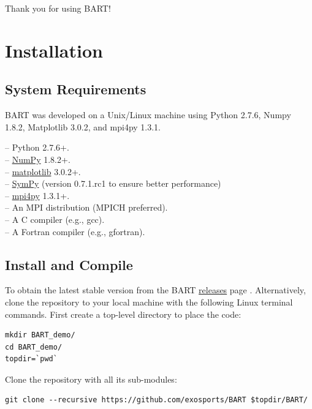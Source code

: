 \documentclass[letterpaper, 12pt]{article}
\begin{document}
\noindent
Thank you for using BART! \newline

\section{Installation}
\label{sec:installation}

\subsection{System Requirements}
\label{sec:requirements}

BART was developed on a Unix/Linux machine using Python 2.7.6, Numpy
1.8.2, Matplotlib 3.0.2, and mpi4py 1.3.1.

\noindent -- Python 2.7.6+. \\
\noindent -- \href{http://www.numpy.org/}{NumPy} 1.8.2+. \\
\noindent -- \href{http://matplotlib.org/index.html}{matplotlib} 3.0.2+. \\
\noindent -- \href{https://github.com/sympy/sympy/releases/tag/sympy/0.7.1.rc1}
                  {SymPy} (version 0.7.1.rc1 to ensure better performance) \\
\noindent -- \href{http://mpi4py.scipy.org/docs/usrman/install.html}
                  {mpi4py} 1.3.1+. \\
\noindent -- An MPI distribution (MPICH preferred). \\
\noindent -- A C compiler (e.g., gcc). \\
\noindent -- A Fortran compiler (e.g., gfortran). \\

\subsection{Install and Compile}
\label{sec:install}

To obtain the latest stable version from the BART
\href{https://github.com/exosports/BART/releases}{releases} page
.  Alternatively, clone the repository to your local
machine with the following Linux terminal commands. 
First create a top-level directory to place the code:
\begin{verbatim}
mkdir BART_demo/
cd BART_demo/
topdir=`pwd`
\end{verbatim}
\newline

\noindent Clone the repository with all its sub-modules:
\begin{verbatim}
git clone --recursive https://github.com/exosports/BART $topdir/BART/
\end{verbatim}
\end{document}
